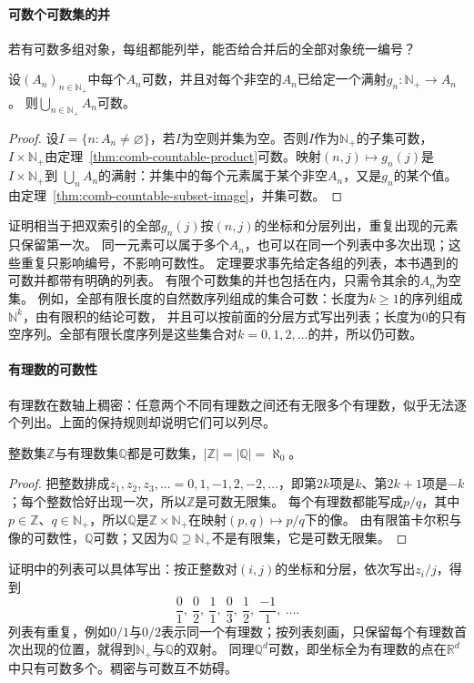 \paragraph{可数个可数集的并}
若有可数多组对象，每组都能列举，能否给合并后的全部对象统一编号？
\begin{theorem}[可数并的可数性]
\label{thm:comb-countable-union}
设$(A_n)_{n\in\mathbb N_+}$中每个$A_n$可数，并且对每个非空的$A_n$已给定一个满射$g_n:\mathbb N_+\to A_n$。
则$\bigcup_{n\in\mathbb N_+}A_n$可数。
\end{theorem}
\begin{proof}
设$I=\{n:A_n\neq\varnothing\}$，若$I$为空则并集为空。否则$I$作为$\mathbb N_+$的子集可数，
$I\times\mathbb N_+$由定理~\ref{thm:comb-countable-product}可数。映射$(n,j)\mapsto g_n(j)$是$I\times\mathbb N_+$到
$\bigcup_nA_n$的满射：并集中的每个元素属于某个非空$A_n$，又是$g_n$的某个值。由定理~\ref{thm:comb-countable-subset-image}，并集可数。
\end{proof}
证明相当于把双索引的全部$g_n(j)$按$(n,j)$的坐标和分层列出，重复出现的元素只保留第一次。
同一元素可以属于多个$A_n$，也可以在同一个列表中多次出现；这些重复只影响编号，不影响可数性。
定理要求事先给定各组的列表，本书遇到的可数并都带有明确的列表。
有限个可数集的并也包括在内，只需令其余的$A_n$为空集。
例如，全部有限长度的自然数序列组成的集合可数：长度为$k\geq1$的序列组成$\mathbb N^k$，由有限积的结论可数，
并且可以按前面的分层方式写出列表；长度为$0$的只有空序列。全部有限长度序列是这些集合对$k=0,1,2,\ldots$的并，所以仍可数。

\paragraph{有理数的可数性}
有理数在数轴上稠密：任意两个不同有理数之间还有无限多个有理数，似乎无法逐个列出。上面的保持规则却说明它们可以列尽。
\begin{theorem}[有理数可数]
\label{thm:card-rationals-countable}
整数集$\mathbb Z$与有理数集$\mathbb Q$都是可数集，$|\mathbb Z|=|\mathbb Q|=\aleph_0$。
\end{theorem}
\begin{proof}
把整数排成$z_1,z_2,z_3,\ldots=0,1,-1,2,-2,\ldots$，即第$2k$项是$k$、第$2k+1$项是$-k$；每个整数恰好出现一次，所以$\mathbb Z$是可数无限集。
每个有理数都能写成$p/q$，其中$p\in\mathbb Z$、$q\in\mathbb N_+$，所以$\mathbb Q$是$\mathbb Z\times\mathbb N_+$在映射$(p,q)\mapsto p/q$下的像。
由有限笛卡尔积与像的可数性，$\mathbb Q$可数；又因为$\mathbb Q\supseteq\mathbb N_+$不是有限集，它是可数无限集。
\end{proof}
证明中的列表可以具体写出：按正整数对$(i,j)$的坐标和分层，依次写出$z_i/j$，得到
\[
 \frac{0}{1},\ \frac{0}{2},\ \frac{1}{1},\ \frac{0}{3},\ \frac{1}{2},\ \frac{-1}{1},\ \ldots.
\]
列表有重复，例如$0/1$与$0/2$表示同一个有理数；按列表刻画，只保留每个有理数首次出现的位置，就得到$\mathbb N_+$与$\mathbb Q$的双射。
同理$\mathbb Q^d$可数，即坐标全为有理数的点在$\mathbb R^d$中只有可数多个。稠密与可数互不妨碍。

